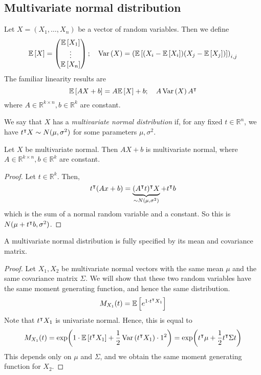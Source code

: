 \subsection{Multivariate normal distribution}
Let \( X = (X_1, \dots, X_n) \) be a vector of random variables.
Then we define
\[ \mathbb{E}\left[{X}\right] = \begin{pmatrix}
    \mathbb{E}\left[{X_1}\right] \\
    \vdots \\
    \mathbb{E}\left[{X_n}\right]
\end{pmatrix};\quad \operatorname{Var}\left({X}\right) = \qty( \mathbb{E}\left[{\qty(X_i - \mathbb{E}\left[{X_i}\right])\qty(X_j - \mathbb{E}\left[{X_j}\right])}\right] )_{i,j} \]
The familiar linearity results are
\[ \mathbb{E}\left[{AX+b}\right] = A\mathbb{E}\left[{X}\right] + b;\quad A \operatorname{Var}\left({X}\right) A^\intercal \]
where \( A \in \mathbb R^{k \times n}, b \in \mathbb R^k \) are constant.
\begin{definition}
    We say that \( X \) has a \textit{multivariate normal distribution} if, for any fixed \( t \in \mathbb R^n \), we have \( t^\intercal X \sim N(\mu, \sigma^2) \) for some parameters \( \mu, \sigma^2 \).
\end{definition}
\begin{proposition}
    Let \( X \) be multivariate normal.
    Then \( AX+b \) is multivariate normal, where \( A \in \mathbb R^{k \times n}, b \in \mathbb R^k \) are constant.
\end{proposition}
\begin{proof}
    Let \( t \in \mathbb R^k \).
    Then,
    \[ t^\intercal (Ax+b) = \underbrace{(A^\intercal t)^\intercal X}_{\sim N(\mu, \sigma^2)} + t^\intercal b \]
    which is the sum of a normal random variable and a constant.
    So this is \( N(\mu + t^\intercal b, \sigma^2) \).
\end{proof}
\begin{proposition}
    A multivariate normal distribution is fully specified by its mean and covariance matrix.
\end{proposition}
\begin{proof}
    Let \( X_1, X_2 \) be multivariate normal vectors with the same mean \( \mu \) and the same covariance matrix \( \Sigma \).
    We will show that these two random variables have the same moment generating function, and hence the same distribution.
    \[ M_{X_1}(t) = \mathbb{E}\left[{ e^{1 \cdot t^\intercal X_1} }\right] \]
	Note that \( t^\intercal X_1 \) is univariate normal.
	Hence, this is equal to
	\[ M_{X_1}(t) = \exp(1 \cdot \mathbb{E}\left[{t^\intercal X_1}\right] + \frac{1}{2} \operatorname{Var}\left({t^\intercal X_1}\right) \cdot 1^2) = \exp(t^\intercal \mu + \frac{1}{2} t^\intercal \Sigma t) \]
	This depends only on \( \mu \) and \( \Sigma \), and we obtain the same moment generating function for \( X_2 \).
\end{proof}

